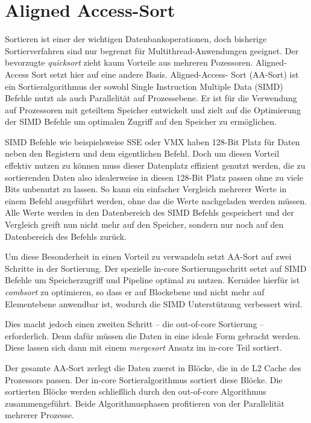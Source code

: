 \section{Aligned Access-Sort}
\label{sec:Sort_2_AA-Sort}

Sortieren ist einer der wichtigen Datenbankoperationen, doch bisherige Sortierverfahren sind nur begrenzt für Multithread-Anwendungen geeignet. Der bevorzugte \textit{quicksort} zieht kaum Vorteile aus mehreren Pozessoren. Aligned-Access Sort \cite{INOUE} setzt hier auf eine andere Basis. Aligned-Access- Sort (AA-Sort) ist ein Sortieralgorithmus der sowohl Single Instruction Multiple Data (SIMD) Befehle nutzt als auch Parallelität auf Prozessebene. Er ist für die Verwendung auf Prozessoren mit geteiltem Speicher entwickelt und zielt auf die Optimierung der SIMD Befehle um optimalen Zugriff auf den Speicher zu ermöglichen.

SIMD Befehle wie beispielsweise SSE oder VMX haben 128-Bit Platz für Daten neben den Registern und dem eigentlichen Befehl. Doch um diesen Vorteil effektiv nutzen zu können muss dieser Datenplatz effizient genutzt werden, die zu sortierenden Daten also idealerweise in diesen 128-Bit Platz passen ohne zu viele Bits unbenutzt zu lassen. So kann ein einfacher Vergleich mehrerer Werte in einem Befehl ausgeführt werden, ohne das die Werte nachgeladen werden müssen. Alle Werte werden in den Datenbereich des SIMD Befehls gespeichert und der Vergleich greift nun nicht mehr auf den Speicher, sondern nur noch auf den Datenbereich des Befehls zurück.

Um diese Besonderheit in einen Vorteil zu verwandeln setzt AA-Sort auf zwei Schritte in der Sortierung. Der spezielle in-core Sortierungsschritt setzt auf SIMD Befehle um Speicherzugriff und Pipeline optimal zu nutzen. Kernidee hierfür ist \textit{combsort} \cite{LACEY} zu optimieren, so dass er auf Blockebene und nicht mehr auf Elementebene anwendbar ist, wodurch die SIMD Unterstützung verbessert wird.

Dies macht jedoch einen zweiten Schritt – die out-of-core Sortierung – erforderlich. Denn dafür müssen die Daten in eine ideale Form gebracht werden. Diese lassen sich dann mit einem \textit{mergesort} Ansatz im in-core Teil sortiert.

Der gesamte AA-Sort zerlegt die Daten zuerst in Blöcke, die in de L2 Cache des Prozessors passen. Der in-core Sortieralgorithmus sortiert diese Blöcke. Die sortierten Blöcke werden schließlich durch den out-of-core Algorithmus zusammengeführt. Beide Algorithmusphasen profitieren von der Parallelität mehrerer Prozesse.


